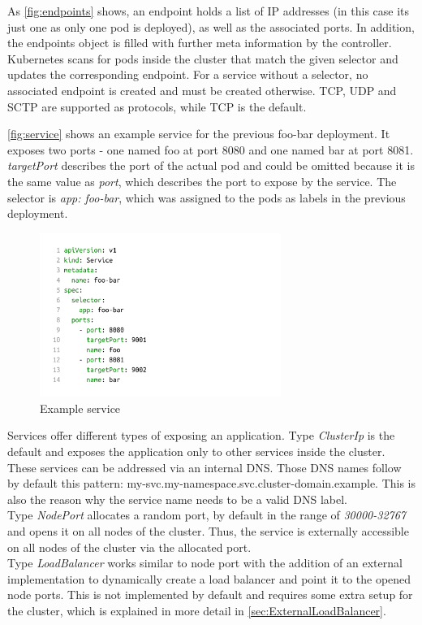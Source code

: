 As \autoref{fig:endpoints} shows, an endpoint holds a list of IP addresses (in this case its just one as only one pod is deployed), as well as the associated ports.
In addition, the endpoints object is filled with further meta information by the controller.
Kubernetes scans for pods inside the cluster that match the given selector and updates the corresponding endpoint.
For a service without a selector, no associated endpoint is created and must be created otherwise.
TCP, UDP and SCTP are supported as protocols, while TCP is the default.

\autoref{fig:service} shows an example service for the previous foo-bar deployment.
It exposes two ports - one named foo at port 8080 and one named bar at port 8081.
\textit{targetPort} describes the port of the actual pod and could be omitted because it is the same value as \textit{port}, which describes the port to expose by the service.
The selector is \textit{app: foo-bar}, which was assigned to the pods as labels in the previous deployment.

\begin{figure}[H]
    \centering
    \includegraphics[width=0.7\textwidth, left]{media/02/service}
    \caption{Example service}
    \label{fig:service}
\end{figure}

Services offer different types of exposing an application.
Type \textit{ClusterIp} is the default and exposes the application only to other services inside the cluster.
These services can be addressed via an internal DNS.
Those DNS names follow by default this pattern: my-svc.my-namespace.svc.cluster-domain.example.
This is also the reason why the service name needs to be a valid DNS label.
\\
Type \textit{NodePort} allocates a random port, by default in the range of \textit{30000-32767} and opens it on all nodes of the cluster.
Thus, the service is externally accessible on all nodes of the cluster via the allocated port.
\\
Type \textit{LoadBalancer} works similar to node port with the addition of an external implementation to dynamically create a load balancer and point it to the opened node ports.
This is not implemented by default and requires some extra setup for the cluster, which is explained in more detail in \autoref{sec:ExternalLoadBalancer}.~\cite{KUBERNETES-SERVICE}

